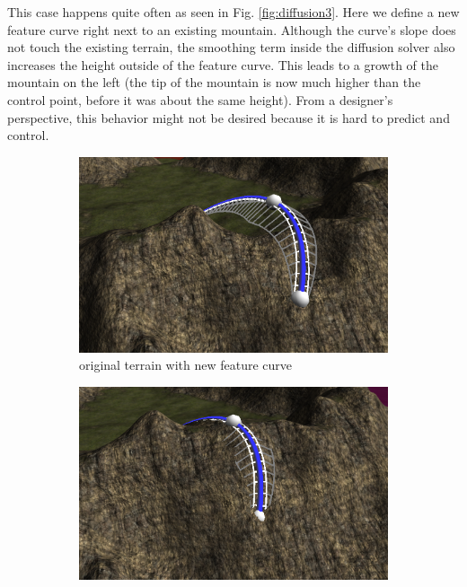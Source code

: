 \documentclass[journal, letterpaper]{IEEEtran}
\begin{document}
This case happens quite often as seen in Fig. \ref{fig:diffusion3}. Here we define a new feature curve right next to an existing mountain. Although the curve's slope does not touch the existing terrain, the smoothing term inside the diffusion solver also increases the height outside of the feature curve. This leads to a growth of the mountain on the left (the tip of the mountain is now much higher than the control point, before it was about the same height).
From a designer's perspective, this behavior might not be desired because it is hard to predict and control.

\begin{figure}
	\centering
	\begin{subfigure}[b]{0.3\textwidth}
		\includegraphics[width=\textwidth]{images/diffusionError1}
		\caption{original terrain with new feature curve}
		\label{fig:diffusionError1}
	\end{subfigure}
	\begin{subfigure}[b]{0.3\textwidth}
		\includegraphics[width=\textwidth]{images/diffusionError2}

\end{subfigure}
\end{figure}
\end{document}
